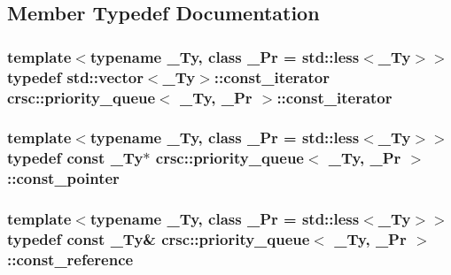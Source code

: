 \subsection{Member Typedef Documentation}
\subsubsection[{\texorpdfstring{const\+\_\+iterator}{const_iterator}}]{\setlength{\rightskip}{0pt plus 5cm}template$<$typename \+\_\+\+Ty, class \+\_\+\+Pr = std\+::less$<$\+\_\+\+Ty$>$$>$ typedef std\+::vector$<$\+\_\+\+Ty$>$\+::{\bf const\+\_\+iterator} {\bf crsc\+::priority\+\_\+queue}$<$ \+\_\+\+Ty, \+\_\+\+Pr $>$\+::{\bf const\+\_\+iterator}}\hypertarget{classcrsc_1_1priority__queue_a35736d93262db4fdd6d4a71bf785f9b9}{}\label{classcrsc_1_1priority__queue_a35736d93262db4fdd6d4a71bf785f9b9}
\subsubsection[{\texorpdfstring{const\+\_\+pointer}{const_pointer}}]{\setlength{\rightskip}{0pt plus 5cm}template$<$typename \+\_\+\+Ty, class \+\_\+\+Pr = std\+::less$<$\+\_\+\+Ty$>$$>$ typedef const \+\_\+\+Ty$\ast$ {\bf crsc\+::priority\+\_\+queue}$<$ \+\_\+\+Ty, \+\_\+\+Pr $>$\+::{\bf const\+\_\+pointer}}\hypertarget{classcrsc_1_1priority__queue_aeeaf3b92bbdb4475f0262588875e74b4}{}\label{classcrsc_1_1priority__queue_aeeaf3b92bbdb4475f0262588875e74b4}
\subsubsection[{\texorpdfstring{const\+\_\+reference}{const_reference}}]{\setlength{\rightskip}{0pt plus 5cm}template$<$typename \+\_\+\+Ty, class \+\_\+\+Pr = std\+::less$<$\+\_\+\+Ty$>$$>$ typedef const \+\_\+\+Ty\& {\bf crsc\+::priority\+\_\+queue}$<$ \+\_\+\+Ty, \+\_\+\+Pr $>$\+::{\bf const\+\_\+reference}}\hypertarget{classcrsc_1_1priority__queue_a654551a6a31b69c37ee6bac13b22d262}{}\label{classcrsc_1_1priority__queue_a654551a6a31b69c37ee6bac13b22d262}
